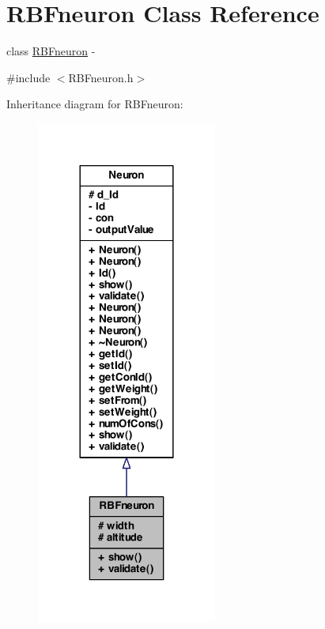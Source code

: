 \hypertarget{class_r_b_fneuron}{
\section{RBFneuron Class Reference}
\label{class_r_b_fneuron}
}


class \hyperlink{class_r_b_fneuron}{RBFneuron} -\/  




{\ttfamily \#include $<$RBFneuron.h$>$}



Inheritance diagram for RBFneuron:
\nopagebreak
\begin{figure}[H]
\begin{center}
\leavevmode
\includegraphics[width=168pt]{class_r_b_fneuron__inherit__graph}
\end{center}
\end{figure}


